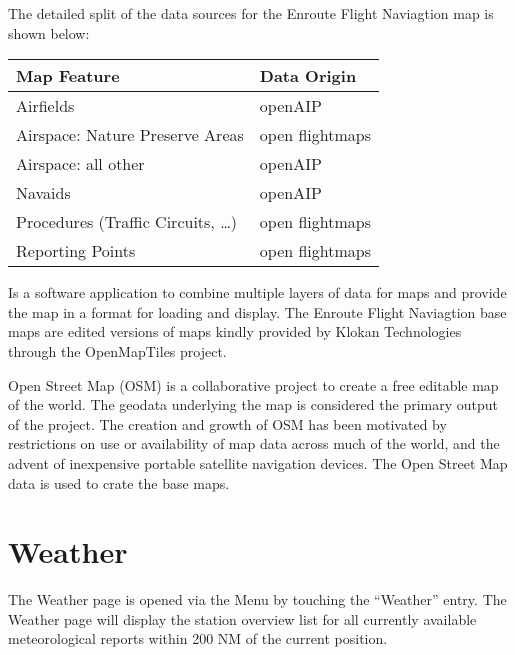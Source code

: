 \documentclass[letterpaper,10pt,english]{sphinxmanual}
\begin{document}
The detailed split of the data sources for the Enroute Flight Naviagtion map is shown below:


\begin{savenotes}\sphinxattablestart
\centering
\begin{tabulary}{\linewidth}[t]{|T|T|}
\hline
\sphinxstyletheadfamily 
Map Feature
&\sphinxstyletheadfamily 
Data Origin
\\
\hline
Airfields
&
openAIP
\\
\hline
Airspace: Nature Preserve Areas
&
open flightmaps
\\
\hline
Airspace: all other
&
openAIP
\\
\hline
Navaids
&
openAIP
\\
\hline
Procedures (Traffic Circuits, …)
&
open flightmaps
\\
\hline
Reporting Points
&
open flightmaps
\\
\hline
\end{tabulary}
\par
\sphinxattableend\end{savenotes}


Is a software application to combine multiple layers of data for maps and provide the map in a format for loading and display.
The Enroute Flight Naviagtion base maps are edited versions of maps kindly provided by Klokan Technologies through the OpenMapTiles project.


Open Street Map (OSM) is a collaborative project to create a free editable map of the world. The geodata underlying the map is considered the primary output of the project. The creation and growth of OSM has been motivated by restrictions on use or availability of map data across much of the world, and the advent of inexpensive portable satellite navigation devices.
The Open Street Map data is used to crate the base maps.


\chapter{Weather}
\label{\detokenize{02-reference/weather:weather}}\label{\detokenize{02-reference/weather::doc}}
The Weather page is opened via the Menu by touching the “Weather” entry.
The Weather page will display the station overview list for all currently available meteorological reports within 200 NM of the current position.
\end{document}

